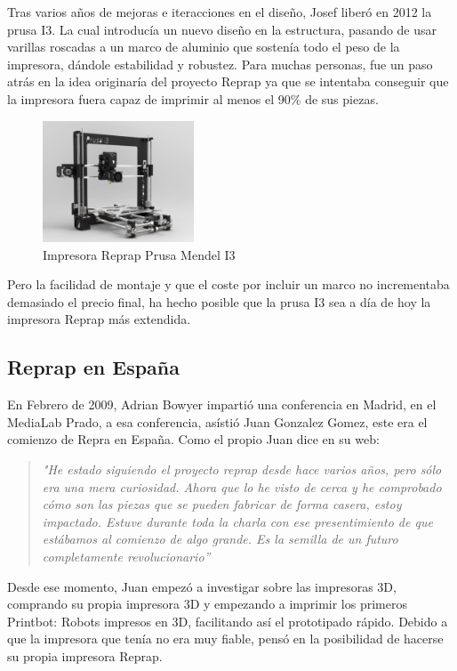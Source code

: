 Tras varios años de mejoras e iteracciones en el diseño, Josef liberó en 2012 la prusa I3. La cual introducía un nuevo diseño en la estructura, pasando de usar varillas roscadas a un marco de aluminio que sostenía todo el peso de la impresora, dándole estabilidad y robustez. Para muchas personas, fue un paso atrás en la idea originaría del proyecto Reprap ya que se intentaba conseguir que la impresora fuera capaz de imprimir al menos el 90\% de sus piezas.

\begin{figure}[H]
        \centering
        \includegraphics[width=0.4\textwidth]{images/prusa_i3.png}
        \caption{Impresora Reprap Prusa Mendel I3}
        \label{fig:estado_i3}
\end{figure}

Pero la facilidad de montaje y que el coste por incluir un marco no incrementaba demasiado el precio final, ha hecho posible que la prusa I3 sea a día de hoy la impresora Reprap más extendida.
\subsection{Reprap en España}

En Febrero de 2009, Adrian Bowyer impartió una conferencia en Madrid, en el MediaLab Prado, a esa conferencia, asístió Juan Gonzalez Gomez, este era el comienzo de Repra en España. Como el propio Juan dice en su web\cite{juan1}:

\begin{quotation}
\emph{
"He estado siguiendo el proyecto reprap desde hace varios años, pero sólo era una mera
curiosidad. Ahora que lo he visto de cerca y he comprobado cómo son las piezas que se
pueden fabricar de forma casera, estoy impactado. Estuve durante toda la charla con ese 
presentimiento de que estábamos al comienzo de algo grande. Es la semilla de un futuro
completamente revolucionario”}
\end{quotation}

Desde ese momento, Juan empezó a investigar sobre las impresoras 3D, comprando su propia impresora 3D\cite{juanR1} y empezando a imprimir los primeros Printbot: Robots impresos en 3D, facilitando así el prototipado rápido. Debido a que la impresora que tenía no era muy fiable, pensó en la posibilidad de hacerse su propia impresora Reprap.\\

